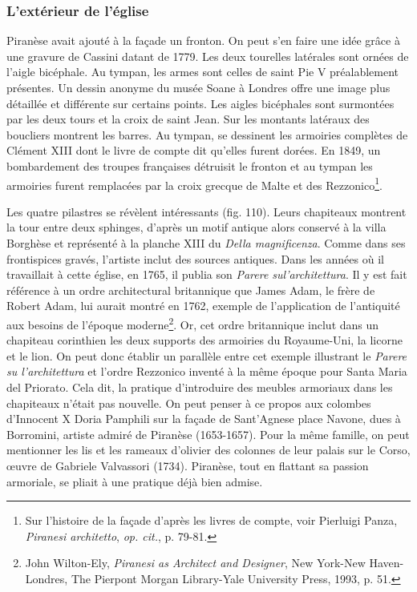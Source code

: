 \documentclass[12pt,twoside,openany]{book}
\begin{document}
\subsubsection{L’extérieur de l’église}

Piranèse avait ajouté à la façade un fronton. On peut s’en faire une idée grâce à une gravure de Cassini datant de 1779. Les deux tourelles latérales sont ornées de l’aigle bicéphale. Au tympan, les armes sont celles de saint Pie V préalablement présentes. Un dessin anonyme du musée Soane à Londres offre une image plus détaillée et différente sur certains points. Les aigles bicéphales sont surmontées par les deux tours et la croix de saint Jean. Sur les montants latéraux des boucliers montrent les barres. Au tympan, se dessinent les armoiries complètes de Clément XIII dont le livre de compte dit qu’elles furent dorées. En 1849, un bombardement des troupes françaises détruisit le fronton et au tympan les armoiries furent remplacées par la croix grecque de Malte et des Rezzonico\footnote{Sur l’histoire de la façade d’après les livres de compte, voir Pierluigi Panza, \textit{Piranesi architetto},\textit{ op. cit.}, p. 79-81.}.

Les quatre pilastres se révèlent intéressants (fig. 110). Leurs chapiteaux montrent la tour entre deux sphinges, d’après un motif antique alors conservé à la villa Borghèse et représenté à la planche XIII du \textit{Della magnificenza}. Comme dans ses frontispices gravés, l’artiste inclut des sources antiques. Dans les années où il travaillait à cette église, en 1765, il publia son \textit{Parere sul’architettura}. Il y est fait référence à un ordre architectural britannique que James Adam, le frère de Robert Adam, lui aurait montré en 1762, exemple de l’application de l’antiquité aux besoins de l’époque moderne\footnote{John Wilton-Ely, \textit{Piranesi as Architect and Designer}, New York-New Haven-Londres, The Pierpont Morgan Library-Yale University Press, 1993, p. 51.}. Or, cet ordre britannique inclut dans un chapiteau corinthien les deux supports des armoiries du Royaume-Uni, la licorne et le lion. On peut donc établir un parallèle entre cet exemple illustrant le \textit{Parere su l’architettura} et l’ordre Rezzonico inventé à la même époque pour Santa Maria del Priorato. Cela dit, la pratique d’introduire des meubles armoriaux dans les chapiteaux n’était pas nouvelle. On peut penser à ce propos aux colombes d’Innocent X Doria Pamphili sur la façade de Sant’Agnese place Navone, dues à Borromini, artiste admiré de Piranèse (1653-1657). Pour la même famille, on peut mentionner les lis et les rameaux d’olivier des colonnes de leur palais sur le Corso, œuvre de Gabriele Valvassori (1734). Piranèse, tout en flattant sa passion armoriale, se pliait à une pratique déjà bien admise.
\end{document}

